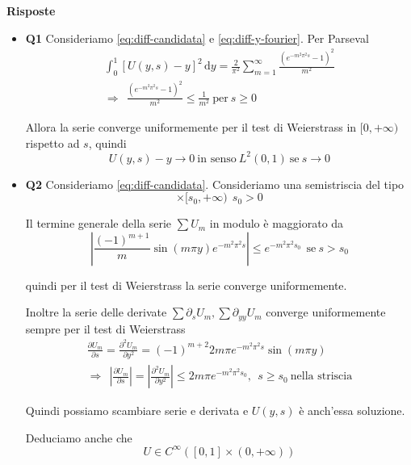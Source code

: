 \documentclass[10pt,a4paper,twoside,openright]{book}
\newcommand{\de}{\,\mathrm d}
\newcommand{\dy}{\de y}
\begin{document}
\textbf{Risposte}
\begin{itemize}
\item \textbf{Q1} Consideriamo \eqref{eq:diff-candidata} e \eqref{eq:diff-y-fourier}. Per Parseval
\begin{gather*}
\int ^{1}_{0}[ U(y,s) -y]^{2} \dy=\frac{2}{\pi ^{2}}\sum\limits ^{\infty }_{m=1}\frac{\left(e^{-m^{2} \pi ^{2} s} -1\right)^{2}}{m^{2}}\\
\Rightarrow \ \ \frac{\left(e^{-m^{2} \pi ^{2} s} -1\right)^{2}}{m^{2}} \leqslant \frac{1}{m^{2}} \ \text{per} \ s\geqslant 0
\end{gather*}

Allora la serie converge uniformemente per il test di Weierstrass in $[ 0,+\infty)$ rispetto ad $s$, quindi
\begin{equation*}
U(y,s) -y\rightarrow 0\ \text{in senso} \ L^{2}(0,1) \ \text{se} \ s\rightarrow 0
\end{equation*}
\item \textbf{Q2} Consideriamo \eqref{eq:diff-candidata}. Consideriamo una semistriscia del tipo
\begin{equation*}
[ 0,1] \times [ s_{0},+\infty) \ \ s_{0}  >0
\end{equation*}

Il termine generale della serie $\sum U_{m}$ in modulo è maggiorato da
\begin{equation*}
\left| \frac{(-1)^{m+1}}{m}\sin(m\pi y) e^{-m^{2} \pi ^{2} s}\right| \leqslant e^{-m^{2} \pi ^{2} s_{0}} \ \ \text{se} \ s >s_{0}
\end{equation*}

quindi per il test di Weierstrass la serie converge uniformemente.

Inoltre la serie delle derivate $\sum \partial _{s} U_{m},\sum \partial _{yy} U_{m}$ converge uniformemente sempre per il test di Weierstrass
\begin{gather*}
\frac{\partial U_{m}}{\partial s} =\frac{\partial ^{2} U_{m}}{\partial y^{2}} =(-1)^{m+2} 2m\pi e^{-m^{2} \pi ^{2} s}\sin(m\pi y)\\
\Rightarrow \ \ \left| \frac{\partial U_{m}}{\partial s}\right| =\left| \frac{\partial ^{2} U_{m}}{\partial y^{2}}\right| \leqslant 2m \pi e^{-m^{2} \pi ^{2} s_{0}},\ \ s\geqslant s_{0} \ \text{nella striscia}
\end{gather*}

Quindi possiamo scambiare serie e derivata e $U(y,s)$ è anch'essa soluzione.

Deduciamo anche che
\begin{equation*}
U\in C^{\infty }([ 0,1] \times (0,+\infty))
\end{equation*}


\end{itemize}
\end{document}
